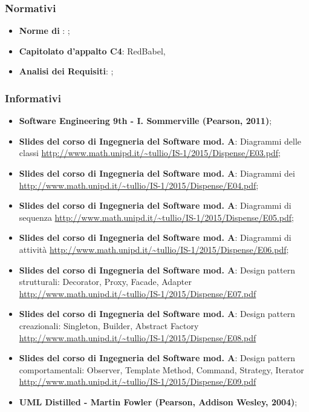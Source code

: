 \subsubsection{Normativi}
\begin{itemize}
\item \textbf{Norme di }: \NormeDiProgetto;
\item \textbf{Capitolato d'appalto C4}: RedBabel,  
\item \textbf{Analisi dei Requisiti}: \AnalisiDeiRequisiti;
\end{itemize}
\subsubsection{Informativi}
\begin{itemize}
\item \textbf{Software Engineering 9th - I. Sommerville (Pearson, 2011)};
\item \textbf{Slides del corso di Ingegneria del Software mod. A}: Diagrammi delle classi \url{http://www.math.unipd.it/~tullio/IS-1/2015/Dispense/E03.pdf};
\item \textbf{Slides del corso di Ingegneria del Software mod. A}: Diagrammi dei \url{http://www.math.unipd.it/~tullio/IS-1/2015/Dispense/E04.pdf};
\item \textbf{Slides del corso di Ingegneria del Software mod. A}: Diagrammi di sequenza \url{http://www.math.unipd.it/~tullio/IS-1/2015/Dispense/E05.pdf};
\item \textbf{Slides del corso di Ingegneria del Software mod. A}: Diagrammi di attività \url{http://www.math.unipd.it/~tullio/IS-1/2015/Dispense/E06.pdf};
\item \textbf{Slides del corso di Ingegneria del Software mod. A}: Design pattern strutturali: Decorator, Proxy, Facade, Adapter \url{http://www.math.unipd.it/~tullio/IS-1/2015/Dispense/E07.pdf}
\item \textbf{Slides del corso di Ingegneria del Software mod. A}: Design pattern creazionali: Singleton, Builder, Abstract Factory \url{http://www.math.unipd.it/~tullio/IS-1/2015/Dispense/E08.pdf}
\item \textbf{Slides del corso di Ingegneria del Software mod. A}: Design pattern comportamentali: Observer, Template Method, Command, Strategy, Iterator \url{http://www.math.unipd.it/~tullio/IS-1/2015/Dispense/E09.pdf}
\item \textbf{UML Distilled - Martin Fowler (Pearson, Addison Wesley, 2004)};

\end{itemize}
